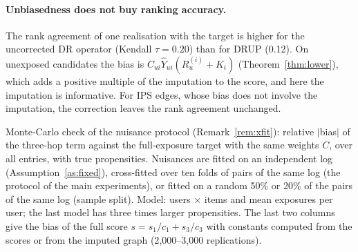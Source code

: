 \paragraph{Unbiasedness does not buy ranking accuracy.} The rank agreement of one
realisation with the target is higher for the uncorrected DR operator (Kendall
$\tau=0.20$) than for DRUP (0.12). On unexposed candidates the bias is
$C_{ui}\hat Y_{ui}(R_u^{(i)}+K_i)$ (Theorem~\ref{thm:lower}), which adds a
positive multiple of the imputation to the score, and here the imputation is
informative. For IPS edges, whose bias does not involve the imputation, the
correction leaves the rank agreement unchanged.

\begin{table}[t]\centering\small
\caption{Monte-Carlo check of the nuisance protocol (Remark~\ref{rem:xfit}): relative
$|$bias$|$ of the three-hop term against the full-exposure target with the same
weights $C$, over all entries, with true propensities. Nuisances are fitted on
an independent log (Assumption~\ref{as:fixed}), cross-fitted over ten folds of
pairs of the same log (the protocol of the main experiments), or fitted on a
random 50\% or 20\% of the pairs of the same log (sample split). Model: users
$\times$ items and mean exposures per user; the last model has three times larger
propensities. The last two columns give the bias of the full score
$s=s_1/c_1+s_3/c_3$ with constants computed from the scores or from the imputed
graph (2{,}000--3{,}000 replications).}\label{tab:protocol}
\begin{adjustbox}{max width=\textwidth}

\end{adjustbox}
\end{table}

